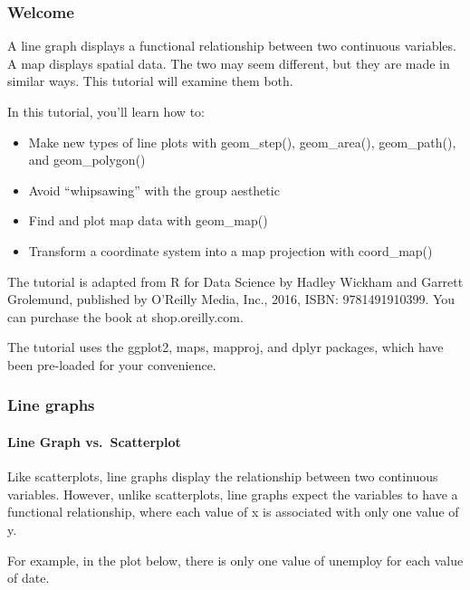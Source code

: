 \documentclass[
]{article}
\providecommand{\tightlist}{%
  \setlength{\itemsep}{0pt}\setlength{\parskip}{0pt}}
\begin{document}
\hypertarget{welcome-10}{%
\subsubsection{Welcome}\label{welcome-10}}

A line graph displays a functional relationship between two continuous
variables. A map displays spatial data. The two may seem different, but
they are made in similar ways. This tutorial will examine them both.

In this tutorial, you'll learn how to:

\begin{itemize}
\tightlist
\item
  Make new types of line plots with geom\_step(), geom\_area(),
  geom\_path(), and geom\_polygon()
\item
  Avoid ``whipsawing'' with the group aesthetic
\item
  Find and plot map data with geom\_map()
\item
  Transform a coordinate system into a map projection with coord\_map()
\end{itemize}

The tutorial is adapted from R for Data Science by Hadley Wickham and
Garrett Grolemund, published by O'Reilly Media, Inc., 2016, ISBN:
9781491910399. You can purchase the book at shop.oreilly.com.

The tutorial uses the ggplot2, maps, mapproj, and dplyr packages, which
have been pre-loaded for your convenience.

\hypertarget{line-graphs}{%
\subsubsection{Line graphs}\label{line-graphs}}

\hypertarget{line-graph-vs.-scatterplot}{%
\paragraph{Line Graph
vs.~Scatterplot}\label{line-graph-vs.-scatterplot}}

Like scatterplots, line graphs display the relationship between two
continuous variables. However, unlike scatterplots, line graphs expect
the variables to have a functional relationship, where each value of x
is associated with only one value of y.

For example, in the plot below, there is only one value of unemploy for
each value of date.
\end{document}
